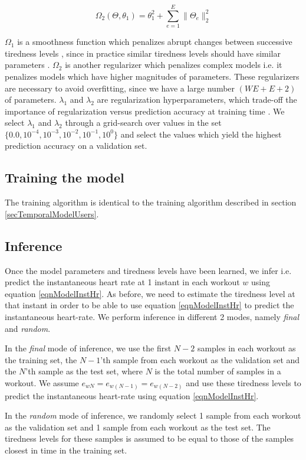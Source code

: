 \documentclass{acm_proc_article-sp}
\begin{document}
$$\Omega_2(\Theta, \theta_1) = \theta_1^2 + \sum_{e=1}^{E}{\|\Theta_e \|_2^2}$$

$\Omega_1$ is a smoothness function which penalizes abrupt changes between successive tiredness levels \cite{www13}, since in practice similar tiredness levels should have similar parameters \cite{www13}. $\Omega_2$ is another regularizer which penalizes complex models i.e. it penalizes models which have higher magnitudes of parameters. These regularizers are necessary to avoid overfitting, since we have a large number $(WE + E + 2)$ of parameters. $\lambda_1$ and $\lambda_2$ are regularization hyperparameters, which trade-off the importance of regularization versus prediction accuracy at training time \cite{www13}. We select $\lambda_1$ and $\lambda_2$ through a grid-search over values in the set $\{0.0, 10^{-4}, 10^{-3}, 10^{-2}, 10^{-1}, 10^{0}\}$ and select the values which yield the highest prediction accuracy on a validation set.

\subsection{Training the model}
The training algorithm is identical to the training algorithm described in section \ref{secTemporalModelUsers}.

\subsection{Inference}
Once the model parameters and tiredness levels have been learned, we infer i.e. predict the instantaneous heart rate at 1 instant in each workout $w$ using equation \ref{eqnModelInstHr}. As before, we need to estimate the tiredness level at that instant in order to be able to use equation \ref{eqnModelInstHr} to predict the instantaneous heart-rate. We perform inference in different 2 modes, namely \emph{final} and \emph{random}. 

In the \emph{final} mode of inference, we use the first $N-2$ samples in each workout as the training set, the $N-1$'th sample from each workout as the validation set and the $N$'th sample as the test set, where $N$ is the total number of samples in a workout. We assume $e_{wN} = e_{w(N-1)} = e_{w(N-2)}$ and use these tiredness levels to predict the instantaneous heart-rate using equation \ref{eqnModelInstHr}.

In the \emph{random} mode of inference, we randomly select 1 sample from each workout as the validation set and 1 sample from each workout as the test set. The tiredness levels for these samples is assumed to be equal to those of the samples closest in time in the training set. 
\end{document}
